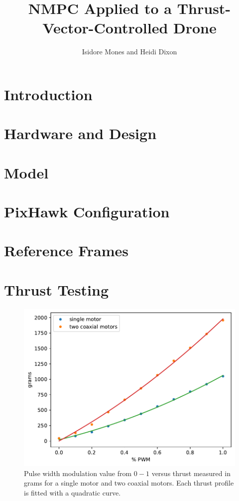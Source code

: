 \documentclass[]{article}
\title{NMPC Applied to a Thrust-Vector-Controlled Drone}
\author{Isidore Mones and Heidi Dixon}
\begin{document}
\maketitle

\section*{Introduction}

\section*{Hardware and Design}

\section*{Model}


\section*{PixHawk Configuration}

\section*{Reference Frames}

\section*{Thrust Testing}
\begin{figure}[H]
	\centering
	\includegraphics[width=\textwidth]{figures/thrust_test_graph.pdf}
	\caption{Pulse width modulation value from $0-1$ versus thrust measured in grams for a single motor and two coaxial motors. Each thrust profile is fitted with a quadratic curve.}
	\label{fig:thrust_test}
\end{figure}
\end{document}
